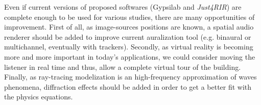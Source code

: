 \documentclass[AMA,STIX1COL]{WileyNJD-v2}
\begin{document}
Even if current versions of proposed softwares (Gypsilab \cite{githubGypsi} and \textit{Just4RIR}) are complete enough to be used for various studies, there are many opportunities of improvement. First of all, as image-sources positions are known, a spatial audio renderer should be added to improve current auralization tool (e.g. binaural or multichannel, eventually with trackers). Secondly, as virtual reality is becoming more and more important in today's applications, we could consider moving the listener in real time and thus, allow a complete virtual tour of the building. Finally, as ray-tracing modelization is an high-frequency approximation of waves phenomena, diffraction effects should be added in order to get a better fit with the physics equations. 
%
%
\end{document}
